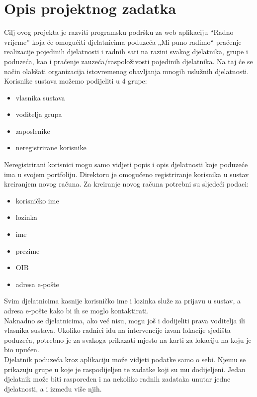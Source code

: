 \chapter{Opis projektnog zadatka}
		
		Cilj ovog projekta je razviti programsku podršku za web aplikaciju “Radno vrijeme” koja će omogućiti  djelatnicima poduzeća „Mi puno radimo“ praćenje realizacije pojedinih djelatnosti i radnih sati na razini svakog djelatnika, grupe i poduzeća, kao i praćenje zauzeća/raspoloživosti pojedinih djelatnika. Na taj će se način olakšati organizacija istovremenog obavljanja mnogih uslužnih djelatnosti.\\
		
		Korisnike sustava možemo podijeliti u 4 grupe: 
		\begin{itemize}
			\item vlasnika sustava
			\item voditelja grupa
			\item zaposlenike
			\item neregistrirane korisnike\\
		\end{itemize}
		
		Neregistrirani korisnici mogu samo vidjeti popis i opis djelatnosti koje poduzeće ima u svojem portfoliju. Direktoru je omogućeno registriranje korisnika u sustav kreiranjem novog računa. Za kreiranje novog računa potrebni su sljedeći podaci:
		\begin{itemize}
			\item korisničko ime
			\item lozinka
			\item ime
			\item prezime
			\item OIB
			\item adresa e-pošte\\
		\end{itemize} 
		
		Svim djelatnicima kasnije korisničko ime i lozinka služe za prijavu u sustav, a adresa e-pošte kako bi ih se moglo kontaktirati. \\
		
		Naknadno se djelatnicima, ako već nisu, mogu još i dodijeliti prava voditelja ili vlasnika sustava. Ukoliko radnici idu na intervencije izvan lokacije sjedišta poduzeća, potrebno je za svakoga prikazati mjesto na karti za lokaciju na koju je bio upućen.\\ 
		
		Djelatnik poduzeća kroz aplikaciju  može vidjeti podatke samo o sebi. Njemu se prikazuju grupe u koje je raspodijeljen te zadatke koji su mu dodijeljeni. Jedan djelatnik može biti raspoređen i na nekoliko radnih zadataka unutar jedne djelatnosti, a i između više njih.\\
		
